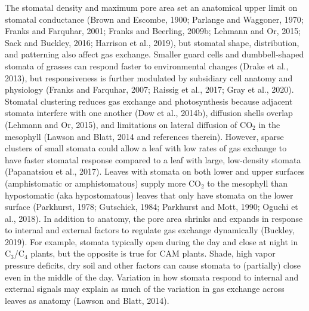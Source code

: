 \documentclass[utf8]{frontiersSCNS}
\begin{document}
The stomatal density and maximum pore area set an anatomical upper limit
on stomatal conductance (Brown and Escombe, 1900; Parlange and Waggoner,
1970; Franks and Farquhar, 2001; Franks and Beerling, 2009b; Lehmann and
Or, 2015; Sack and Buckley, 2016; Harrison et al., 2019), but stomatal
shape, distribution, and patterning also affect gas exchange. Smaller
guard cells and dumbbell-shaped stomata of grasses can respond faster to
environmental changes (Drake et al., 2013), but responsiveness is
further modulated by subsidiary cell anatomy and physiology (Franks and
Farquhar, 2007; Raissig et al., 2017; Gray et al., 2020). Stomatal
clustering reduces gas exchange and photosynthesis because adjacent
stomata interfere with one another (Dow et al., 2014b), diffusion shells
overlap (Lehmann and Or, 2015), and limitations on lateral diffusion of
CO\(_2\) in the mesophyll (Lawson and Blatt, 2014 and references
therein). However, sparse clusters of small stomata could allow a leaf
with low rates of gas exchange to have faster stomatal response compared
to a leaf with large, low-density stomata (Papanatsiou et al., 2017).
Leaves with stomata on both lower and upper surfaces (amphistomatic or
amphistomatous) supply more CO\(_2\) to the mesophyll than hypostomatic
(aka hypostomatous) leaves that only have stomata on the lower surface
(Parkhurst, 1978; Gutschick, 1984; Parkhurst and Mott, 1990; Oguchi et
al., 2018). In addition to anatomy, the pore area shrinks and expands in
response to internal and external factors to regulate gas exchange
dynamically (Buckley, 2019). For example, stomata typically open during
the day and close at night in C\(_3\)/C\(_4\) plants, but the opposite
is true for CAM plants. Shade, high vapor pressure deficits, dry soil
and other factors can cause stomata to (partially) close even in the
middle of the day. Variation in how stomata respond to internal and
external signals may explain as much of the variation in gas exchange
across leaves as anatomy (Lawson and Blatt, 2014).
\end{document}
